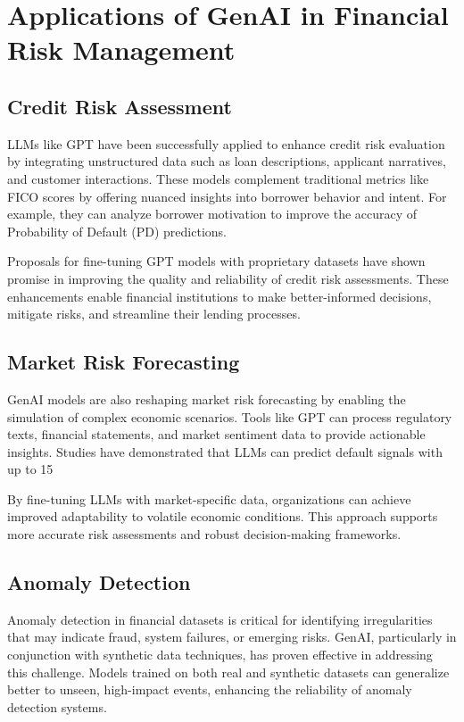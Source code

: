\documentclass[a4paper,headinclude=on,footinclude=on,12pt,oneside]{scrbook}
\begin{document}
\section{Applications of GenAI in Financial Risk Management}

\subsection{Credit Risk Assessment}

LLMs like GPT have been successfully applied to enhance credit risk evaluation by integrating unstructured data such as loan descriptions, applicant narratives, and customer interactions. These models complement traditional metrics like FICO scores by offering nuanced insights into borrower behavior and intent. For example, they can analyze borrower motivation to improve the accuracy of Probability of Default (PD) predictions.

Proposals for fine-tuning GPT models with proprietary datasets have shown promise in improving the quality and reliability of credit risk assessments. These enhancements enable financial institutions to make better-informed decisions, mitigate risks, and streamline their lending processes.

\subsection{Market Risk Forecasting}

GenAI models are also reshaping market risk forecasting by enabling the simulation of complex economic scenarios. Tools like GPT can process regulatory texts, financial statements, and market sentiment data to provide actionable insights. Studies have demonstrated that LLMs can predict default signals with up to 15%

By fine-tuning LLMs with market-specific data, organizations can achieve improved adaptability to volatile economic conditions. This approach supports more accurate risk assessments and robust decision-making frameworks.

\subsection{Anomaly Detection}

Anomaly detection in financial datasets is critical for identifying irregularities that may indicate fraud, system failures, or emerging risks. GenAI, particularly in conjunction with synthetic data techniques, has proven effective in addressing this challenge. Models trained on both real and synthetic datasets can generalize better to unseen, high-impact events, enhancing the reliability of anomaly detection systems.
\end{document}
